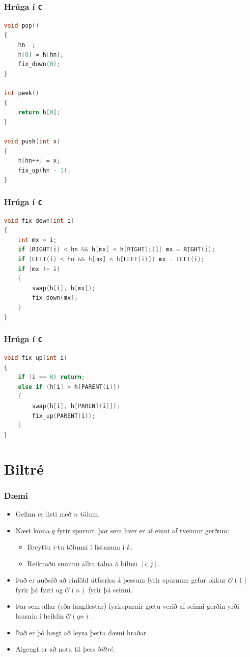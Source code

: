 \documentclass[handout]{beamer}
\begin{document}
\begin{frame}[fragile]
	\frametitle{Hrúga í \texttt{C}}
	\tiny
	\begin{lstlisting}[language=C]
void pop()
{
	hn--;
	h[0] = h[hn];
	fix_down(0);
}

int peek()
{
	return h[0];
}

void push(int x)
{
	h[hn++] = x;
	fix_up(hn - 1);
}
\end{lstlisting}
\end{frame}

\begin{frame}[fragile]
	\frametitle{Hrúga í \texttt{C}}
	\tiny
	\begin{lstlisting}[language=C]
void fix_down(int i)
{
	int mx = i;
	if (RIGHT(i) < hn && h[mx] < h[RIGHT(i)]) mx = RIGHT(i);
	if (LEFT(i) < hn && h[mx] < h[LEFT(i)]) mx = LEFT(i);
	if (mx != i)
	{
		swap(h[i], h[mx]);
		fix_down(mx);
	}
}
\end{lstlisting}
\end{frame}

\begin{frame}[fragile]
	\frametitle{Hrúga í \texttt{C}}
	\tiny
	\begin{lstlisting}[language=C]
void fix_up(int i)
{
	if (i == 0) return;
	else if (h[i] > h[PARENT(i)])
	{
		swap(h[i], h[PARENT(i)]);
		fix_up(PARENT(i));
	}
}
\end{lstlisting}
\end{frame}

\section[Biltré]{Biltré}

\begin{frame}
\frametitle{Dæmi}
\begin{itemize}
\item<1-> Gefinn er listi með $n$ tölum.
\item<2-> Næst koma $q$ fyrir spurnir, þar sem hver er af einni af tveimur gerðum:
	\begin{itemize}
	\item<3-> Breyttu $i$-tu tölunni í listanum í $k$.
	\item<4-> Reiknaðu summu allra talna á bilinu $[i, j]$.
	\end{itemize}
\item<5-> Það er auðséð að einföld útfærlsa á þessum fyrir spurnum gefur okkur $\mathcal{O}(1)$ fyrir þá fyrri og $\mathcal{O}(n)$ fyrir þá seinni.
\item<6-> Þar sem allar (eða langflestar) fyrirspurnir gætu verið af seinni gerðin yrði lausnin í heildin $\mathcal{O}(qn)$.
\item<7-> Það er þó hægt að leysa þetta dæmi hraðar.
\item<8-> Algengt er að nota til þess \emph{biltré}.
\end{itemize}
\end{frame}
\end{document}
